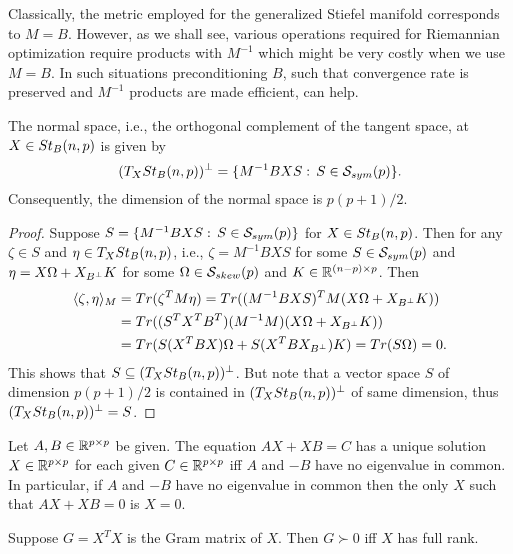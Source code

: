 \documentclass[11pt,a4paper]{article}
\begin{document}
\begin{remark}
Classically, the metric employed for the generalized Stiefel manifold corresponds to $M = B$. However, as we shall see, various operations required for Riemannian optimization require products with $M^{-1}$ which might be very costly when we use $M = B$. In such situations preconditioning $B$, such that convergence rate is preserved and $M^{-1}$ products are made efficient, can help.
\end{remark}

\begin{prop}
The normal space, i.e., the orthogonal complement of the tangent space, at $X\in St_B(n,p)$ is given by
\begin{equation}
(T_XSt_B(n,p))^\perp = \{M^{-1}BXS:\, S\in\mathcal{S}_{sym}(p) \}.
\end{equation}
Consequently, the dimension of the normal space is $p(p+1)/2$.
\end{prop}

\begin{proof}
Suppose $S = \{M^{-1}BXS:\, S\in\mathcal{S}_{sym}(p) \}$ for $X\in St_B(n,p)$. Then for any $\zeta\in S$ and $\eta\in T_XSt_B(n,p)$, i.e., $\zeta = M^{-1}BXS$ for some $S\in \mathcal{S}_{sym}(p)$ and $\eta = X\Omega+X_{B^\perp} K$ for some $\Omega\in \mathcal{S}_{skew}(p)$ and $K\in \mathbb{R}^{(n-p)\times p}$. Then
\begin{align*}
\langle \zeta, \eta \rangle_M &= Tr(\zeta^TM\eta) = Tr((M^{-1}BXS)^TM(X\Omega+X_{B^\perp} K)) \\
&= Tr((S^TX^TB^T)(M^{-1}M)(X\Omega+X_{B^\perp} K)) \\
&= Tr(S(X^TBX)\Omega+S(X^TBX_{B^\perp}) K) = Tr(S\Omega) = 0.
\end{align*}
This shows that $S\subseteq (T_XSt_B(n,p))^\perp$. But note that a vector space $S$ of dimension $p(p+1)/2$ is contained in $(T_XSt_B(n,p))^\perp$ of same dimension, thus $(T_XSt_B(n,p))^\perp = S$.
\end{proof}

\begin{lemma}\label{lemma:sylvester_equation}
Let $A,B\in\mathbb{R}^{p\times p}$ be given. The equation $AX+XB = C$ has a unique solution $X\in\mathbb{R}^{p\times p}$ for each given $C\in\mathbb{R}^{p\times p}$ iff $A$ and $-B$ have no eigenvalue in common. In particular, if $A$ and $-B$ have no eigenvalue in common then the only $X$ such that $AX + X B = 0$ is $X = 0$.
\end{lemma}

\begin{lemma}\label{lemma:gram_matrix_spd}
Suppose $G =X^TX$ is the Gram matrix of $X$. Then $G\succ 0$ iff $X$ has full rank.
\end{lemma}
\end{document}

